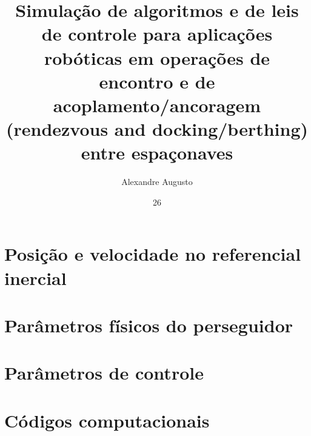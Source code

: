 \documentclass[msc]{ita}
\author{Alexandre Augusto}{Santana de Oliveira}
\title{Simulação de algoritmos e de leis de controle para aplicações robóticas em operações de encontro e de acoplamento/ancoragem (rendezvous and docking/berthing) entre espaçonaves}
\date{26}{fevereiro}{2026}
\begin{document}


\mainmatter


















\renewcommand\bibname{\itareferencesnamebabel} %
\printbibliography

\appendix
\chapter{Posição e velocidade no referencial inercial}


\chapter{Parâmetros físicos do perseguidor}


\chapter{Parâmetros de controle}


\chapter{Códigos computacionais}


\annex


\end{document}

